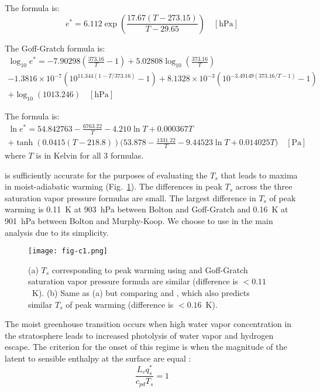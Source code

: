 \documentclass[]{ametsocV6.1}
\begin{document}
The \cite{bolton1980} formula is:
\begin{equation}
e^* = 6.112 \exp\left(\frac{17.67 (T - 273.15)}{T - 29.65}\right) \quad [\text{hPa}]
\label{eq:bolton}
\end{equation}

The Goff-Gratch formula is:
\begin{multline}
\log_{10} e^* = -7.90298 \left(\frac{373.16}{T} - 1\right) + 5.02808 \log_{10}\left(\frac{373.16}{T}\right)\\ - 1.3816 \times 10^{-7} \left(10^{11.344 (1 - T/373.16)} - 1\right) + 8.1328 \times 10^{-3} \left(10^{-3.49149 (373.16/T - 1)} - 1\right)\\ + \log_{10}(1013.246) \quad [\text{hPa}]
\end{multline}

The \cite{murphy2005} formula is:
\begin{multline}
\ln e^* = 54.842763 - \frac{6763.22}{T} - 4.210 \ln T + 0.000367 T\\ + \tanh\left(0.0415 (T - 218.8)\right) \biggl(53.878 - \frac{1331.22}{T} - 9.44523 \ln T + 0.014025 T\biggl) \quad [\text{Pa}]
\end{multline}
where $T$ is in Kelvin for all 3 formulas.

\cite{bolton1980} is sufficiently accurate for the purposes of evaluating the $T_s$ that leads to maxima in moist-adiabatic warming (Fig.~\ref{fig:fig-c1}). The differences in peak $T_s$ across the three saturation vapor pressure formulas are small. The largest difference in $T_s$ of peak warming is 0.11~K at 903~hPa between Bolton and Goff-Gratch and 0.16~K at 901~hPa between Bolton and Murphy-Koop. We choose to use \cite{bolton1980} in the main analysis due to its simplicity.

\begin{figure}[htbp]
 \centering
 \texttt{[image: fig-c1.png]}
 \caption{(a) $T_s$ corresponding to peak warming using \cite{bolton1980} and Goff-Gratch saturation vapor pressure formula are similar (difference is $<0.11$~K). (b) Same as (a) but comparing \cite{bolton1980} and \cite{murphy2005}, which also predicts similar $T_s$ of peak warming (difference is $<0.16$~K).}\label{fig:fig-c1}
\end{figure}

\appendix[D] 
\label{app:sens-vs-mag}
The moist greenhouse transition occurs when high water vapor concentration in the stratosphere leads to increased photolysis of water vapor and hydrogen escape. The criterion for the onset of this regime is when the magnitude of the latent to sensible enthalpy at the surface are equal \citep{wordsworth2013}:
\begin{equation}
\frac{L_v q_s^*}{c_{pd} T_s} = 1
\label{eq:mag-equal}
\end{equation}
\end{document}

